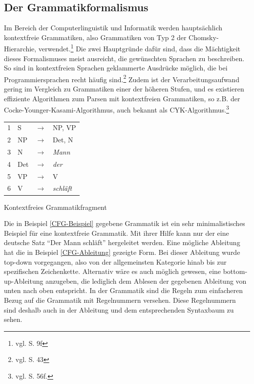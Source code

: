 \subsection{Der Grammatikformalismus}
\label{subsec:grammatik}
Im Bereich der Computerlinguistik und Informatik werden hauptsächlich kontextfreie Grammatiken, also Grammatiken von Typ 2 der Chomsky-Hierarchie, verwendet.\footnote{vgl. \cite{SCHOENING2008} S. 9f} Die zwei Hauptgründe dafür sind, dass die Mächtigkeit dieses Formalismuses meist ausreicht, die gewünschten Sprachen zu beschreiben. So sind in kontextfreien Sprachen geklammerte Ausdrücke möglich, die bei Programmiersprachen recht häufig sind.\footnote{vgl. \cite{SCHOENING2008} S. 43} Zudem ist der Verarbeitungsaufwand gering im Vergleich zu Grammatiken einer der höheren Stufen, und es existieren effiziente Algorithmen zum Parsen mit kontextfreien Grammatiken, so z.B. der Cocke-Younger-Kasami-Algorithmus, auch bekannt als CYK-Algorithmus.\footnote{vgl. \cite{SCHOENING2008} S. 56f.}
\begin{program}[h]
\begin{tabular}{llll}
1 & S & $\longrightarrow$ & NP, VP \\
2 & NP & $\longrightarrow$ & Det, N \\
3 & N & $\longrightarrow$ & \textit{Mann} \\
4 & Det & $\longrightarrow$ & \textit{der} \\
5 & VP & $\longrightarrow$ & V \\
6 & V  & $\longrightarrow$ & \textit{schläft} \\
\end{tabular}
\caption{Kontextfreies Grammatikfragment}
\label{CFG-Beispiel}
\end{program}
Die in Beispiel \ref{CFG-Beispiel} gegebene Grammatik ist ein sehr minimalistisches Beispiel für eine kontextfreie Grammatik. Mit ihrer Hilfe kann nur der eine deutsche Satz "`Der Mann schläft"' hergeleitet werden. Eine mögliche Ableitung hat die in Beispiel \ref{CFG-Ableitung} gezeigte Form. Bei dieser Ableitung  wurde top-down vorgegangen, also von der allgemeinsten Kategorie hinab bis zur spezifischen Zeichenkette. Alternativ wäre es auch möglich gewesen, eine bottom-up-Ableitung anzugeben, die lediglich dem Ablesen der gegebenen Ableitung von unten nach oben entspricht. In der Grammatik sind die Regeln zum einfacheren Bezug auf die Grammatik mit Regelnummern versehen. Diese Regelnummern sind deshalb auch in der Ableitung und dem entsprechenden Syntaxbaum zu sehen. \par
